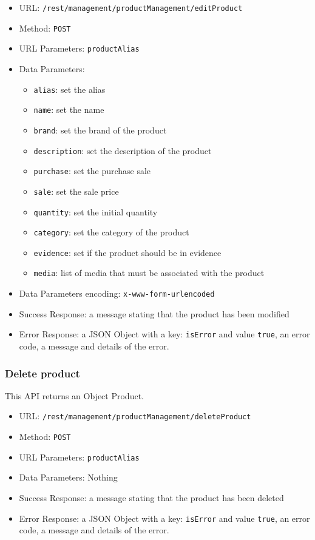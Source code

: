 \begin{itemize}
    \item URL: \texttt{/rest/management/productManagement/editProduct}
    \item Method: \texttt{POST}
    \item URL Parameters: \texttt{productAlias}
    \item Data Parameters: 
    \begin{itemize}
        \item \texttt{alias}: set the alias
        \item \texttt{name}: set the name
        \item \texttt{brand}: set the brand of the product
        \item \texttt{description}: set the description of the product
        \item \texttt{purchase}: set the purchase sale
        \item \texttt{sale}: set the sale price
        \item \texttt{quantity}: set the initial quantity
        \item \texttt{category}: set the category of the product
        \item \texttt{evidence}: set if the product should be in evidence
        \item \texttt{media}: list of media that must be associated with the product
    \end{itemize}
    \item Data Parameters encoding: \texttt{x-www-form-urlencoded}
    \item Success Response: a message stating that the product has been modified
    \item Error Response: a JSON Object with a key: \texttt{isError}  and value \texttt{true}, an error code, a message and details of the error.
\end{itemize}



\subsubsection*{Delete product}
This API returns an Object Product.

\begin{itemize}
    \item URL: \texttt{/rest/management/productManagement/deleteProduct}
    \item Method: \texttt{POST}
    \item URL Parameters: \texttt{productAlias}
    \item Data Parameters: Nothing
    \item Success Response: a message stating that the product has been deleted
    \item Error Response: a JSON Object with a key: \texttt{isError}  and value \texttt{true}, an error code, a message and details of the error.
\end{itemize}


